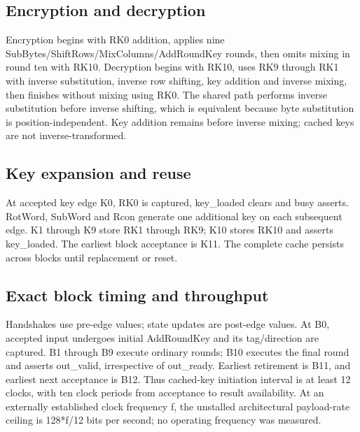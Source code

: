 \documentclass[11pt,a4paper]{article}
\begin{document}
\subsection{Encryption and decryption}

Encryption begins with RK0 addition,\allowbreak{} applies nine SubBytes/\allowbreak{}ShiftRows/\allowbreak{}MixColumns/\allowbreak{}AddRoundKey rounds,\allowbreak{} then omits mixing in round ten with RK10. Decryption begins with RK10,\allowbreak{} uses RK9 through RK1 with inverse substitution,\allowbreak{} inverse row shifting,\allowbreak{} key addition and inverse mixing,\allowbreak{} then finishes without mixing using RK0. The shared path performs inverse substitution before inverse shifting,\allowbreak{} which is equivalent because byte substitution is position-independent. Key addition remains before inverse mixing; cached keys are not inverse-transformed.

\subsection{Key expansion and reuse}

At accepted key edge K0,\allowbreak{} RK0 is captured,\allowbreak{} key\_\allowbreak{}loaded clears and busy asserts. RotWord,\allowbreak{} SubWord and Rcon generate one additional key on each subsequent edge. K1 through K9 store RK1 through RK9; K10 stores RK10 and asserts key\_\allowbreak{}loaded. The earliest block acceptance is K11. The complete cache persists across blocks until replacement or reset.

\subsection{Exact block timing and throughput}

Handshakes use pre-edge values; state updates are post-edge values. At B0,\allowbreak{} accepted input undergoes initial AddRoundKey and its tag/\allowbreak{}direction are captured. B1 through B9 execute ordinary rounds; B10 executes the final round and asserts out\_\allowbreak{}valid,\allowbreak{} irrespective of out\_\allowbreak{}ready. Earliest retirement is B11,\allowbreak{} and earliest next acceptance is B12. Thus cached-key initiation interval is at least 12 clocks,\allowbreak{} with ten clock periods from acceptance to result availability. At an externally established clock frequency f,\allowbreak{} the unstalled architectural payload-rate ceiling is 128*\allowbreak{}f/\allowbreak{}12 bits per second; no operating frequency was measured.
\end{document}

